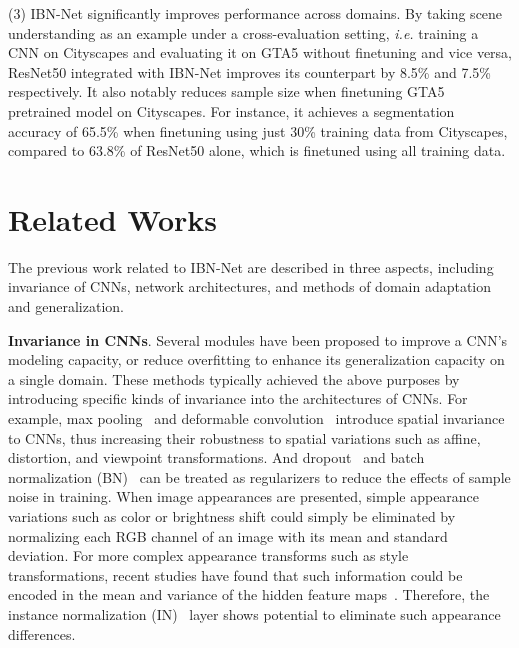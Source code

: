 \documentclass[runningheads]{llncs}
\newcommand{\ie} {\emph{i.e. }}
\begin{document}
(3) IBN-Net significantly improves performance across domains. 
By taking scene understanding as an example under a cross-evaluation setting, \ie training a CNN on Cityscapes and evaluating it on GTA5 without finetuning and vice versa, ResNet50 integrated with IBN-Net improves its counterpart by 8.5\% and 7.5\% respectively.
It also notably reduces sample size when finetuning GTA5 pretrained model on Cityscapes.
For instance, it achieves a segmentation accuracy of 65.5\% when finetuning using just 30\% training data from Cityscapes, compared to 63.8\% of ResNet50 alone, which is finetuned using all training data.

\section{Related Works}

The previous work related to IBN-Net are described in three aspects, including invariance of CNNs, network architectures, and methods of domain adaptation and generalization.

\textbf{Invariance in CNNs}.
Several modules \cite{krizhevsky2012imagenet,dai2017deformable,srivastava2014dropout,ulyanov2017improved,ioffe2015batch} have been proposed to improve a CNN's modeling capacity, or reduce overfitting to enhance its generalization capacity on a single domain.
These methods typically achieved the above purposes by introducing specific kinds of invariance into the architectures of CNNs.
For example, max pooling~\cite{krizhevsky2012imagenet} and deformable convolution~\cite{dai2017deformable} introduce spatial invariance to CNNs, thus increasing their robustness to spatial variations such as affine, distortion, and viewpoint transformations.
And dropout~\cite{srivastava2014dropout} and batch normalization (BN)~\cite{ioffe2015batch} can be treated as regularizers to reduce the effects of sample noise in training.
When image appearances are presented, simple appearance variations such as color or brightness shift could simply be eliminated by normalizing each RGB channel of an image with its mean and standard deviation.
For more complex appearance transforms such as style transformations, recent studies have found that such information could be encoded in the mean and variance of the hidden feature maps~\cite{dumoulin2016learned,huang2017arbitrary}.
Therefore, the instance normalization (IN)~\cite{ulyanov2017improved} layer shows potential to eliminate such appearance differences.
\end{document}

